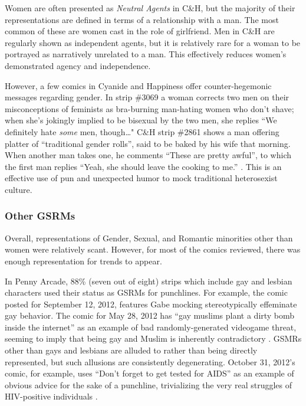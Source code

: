 \documentclass[man,12pt]{apa6}
\begin{document}
Women are often presented as \emph{Neutral Agents} in C\&H, but the majority of their representations are defined in terms of a relationship with a man. The most common of these are women cast in the role of girlfriend. Men in C\&H are regularly shown as independent agents, but it is relatively rare for a woman to be portrayed as narratively unrelated to a man. This effectively reduces women's demonstrated agency and independence. 

However, a few comics in Cyanide and Happiness offer counter-hegemonic messages regarding gender. In strip \#3069 a woman corrects two men on their misconceptions of feminists as bra-burning man-hating women who don't shave; when she's jokingly implied to be bisexual by the two men, she replies ``We definitely hate \emph{some} men, though\ldots" C\&H strip \#2861 shows a man offering platter of ``traditional gender rolls'', said to be baked by his wife that morning. When another man takes one, he comments ``These are pretty awful'', to which the first man replies ``Yeah, she should leave the cooking to me.'' \cite{ch}. This is an effective use of pun and unexpected humor to mock traditional heterosexist culture. 

\subsubsection{Other GSRMs}
Overall, representations of Gender, Sexual, and Romantic minorities other than women were relatively scant. However, for most of the comics reviewed, there was enough representation for trends to appear. 

In Penny Arcade, 88\% (seven out of eight) strips which include gay and lesbian characters used their status as GSRMs for punchlines. For example, the comic posted for September 12, 2012, features Gabe mocking stereotypically effeminate gay behavior. The comic for May 28, 2012 has ``gay muslims plant a dirty bomb inside the internet'' as an example of bad randomly-generated videogame threat, seeming to imply that being gay and Muslim is inherently contradictory \cite{pa}. GSMRs other than gays and lesbians are alluded to rather than being directly represented, but such allusions are consistently degenerating. October 31, 2012's comic, for example, uses ``Don't forget to get tested for AIDS'' as an example of obvious advice for the sake of a punchline, trivializing the very real struggles of HIV-positive individuals \cite{pa}.
\end{document}
